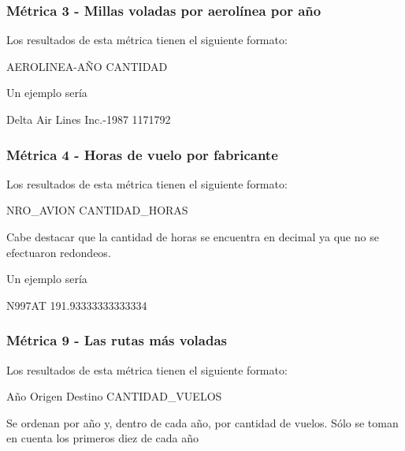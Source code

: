 \documentclass[a4paper,10pt]{article}
\begin{document}
        \subsubsection{Métrica 3 - Millas voladas por aerolínea por año}
            Los resultados de esta métrica tienen el siguiente formato:\\
            \begin{center}
                AEROLINEA-AÑO CANTIDAD\\
            \end{center}

            Un ejemplo sería\\
            \begin{center}
               Delta Air Lines Inc.-1987   1171792\\
            \end{center}

        \subsubsection{Métrica 4 - Horas de vuelo por fabricante}
            Los resultados de esta métrica tienen el siguiente formato:\\
            \begin{center}
                NRO\_AVION CANTIDAD\_HORAS
            \end{center}
            Cabe destacar que la cantidad de horas se encuentra en decimal ya que no se efectuaron redondeos.

            Un ejemplo sería\\
            \begin{center}
                N997AT  191.93333333333334\\
            \end{center}

 \subsubsection{Métrica 9 - Las rutas más voladas}
            Los resultados de esta métrica tienen el siguiente formato:\\
            \begin{center}
                Año Origen Destino CANTIDAD\_VUELOS
            \end{center}
            Se ordenan por año y, dentro de cada año, por cantidad de vuelos. Sólo se toman en cuenta los primeros diez de cada año
\end{document}
